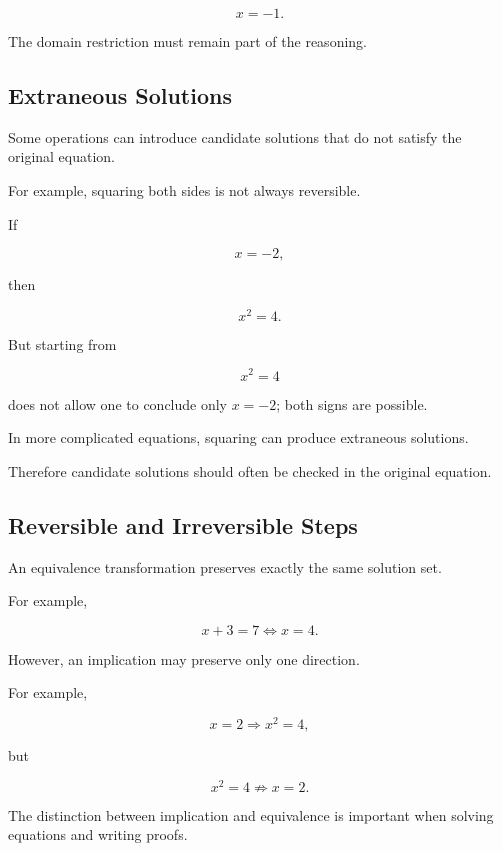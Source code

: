 \[ x=-1. \]

The domain restriction must remain part of the reasoning.

\subsection{Extraneous Solutions}
\label{subsec:extraneous-solutions}

Some operations can introduce candidate solutions that do not satisfy the
original equation.

For example, squaring both sides is not always reversible.

If

\[ x=-2, \]

then

\[ x^2=4. \]

But starting from

\[ x^2=4 \]

does not allow one to conclude only \(x=-2\); both signs are possible.

In more complicated equations, squaring can produce extraneous solutions.

Therefore candidate solutions should often be checked in the original
equation.

\subsection{Reversible and Irreversible Steps}
\label{subsec:reversible-steps}

An equivalence transformation preserves exactly the same solution set.

For example,

\[ x+3=7\Longleftrightarrow x=4. \]

However, an implication may preserve only one direction.

For example,

\[ x=2\Longrightarrow x^2=4, \]

but

\[ x^2=4\not\Longrightarrow x=2. \]

The distinction between implication and equivalence is important when solving
equations and writing proofs.

